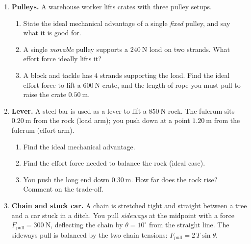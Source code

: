 \documentclass[12pt, twoside]{article}
\begin{document}
\begin{enumerate}[itemsep=0.45cm]

\item \textbf{Pulleys.} A warehouse worker lifts crates with three pulley setups.
  \begin{enumerate}[itemsep=2.7cm]
    \item State the ideal mechanical advantage of a single \emph{fixed} pulley, and say what it is good for.
    \item A single \emph{movable} pulley supports a $240~\text{N}$ load on two strands. What effort force ideally lifts it?
    \item A block and tackle has $4$ strands supporting the load. Find the ideal effort force to lift a $600~\text{N}$ crate, and the length of rope you must pull to raise the crate $0.50~\text{m}$.
  \end{enumerate}
  \vspace{1.3cm}
\newpage
\item \textbf{Lever.} A steel bar is used as a lever to lift a $850~\text{N}$ rock. The fulcrum sits $0.20~\text{m}$ from the rock (load arm); you push down at a point $1.20~\text{m}$ from the fulcrum (effort arm).
  \begin{enumerate}[itemsep=4.7cm]
    \item Find the ideal mechanical advantage.
    \item Find the effort force needed to balance the rock (ideal case).
    \item You push the long end down $0.30~\text{m}$. How far does the rock rise? Comment on the trade-off.
  \end{enumerate}
  \vspace{1.3cm}

  \newpage
\item \textbf{Chain and stuck car.} A chain is stretched tight and straight between a tree and a car
stuck in a ditch. You pull \emph{sideways} at the midpoint with a force $F_\text{pull}=300~\text{N}$,
deflecting the chain by $\theta = 10^\circ$ from the straight line. The sideways pull is balanced by the
two chain tensions: $F_\text{pull}=2\,T\sin\theta$.

\begin{center}
\end{center}


\end{enumerate}
\end{document}
